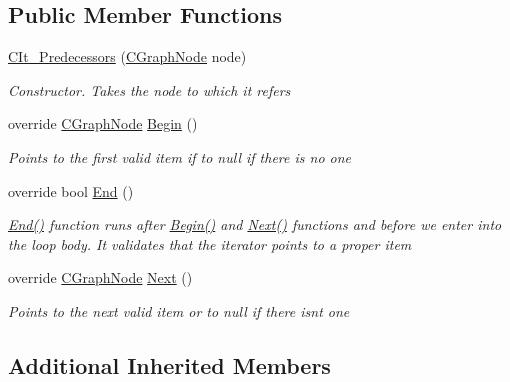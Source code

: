 \subsection*{Public Member Functions}
\begin{DoxyCompactItemize}
\item 
\hyperlink{class_graph_library_1_1_c_it___predecessors_ab9fa002e3d6b597d7712faab5613cbe3}{C\+It\+\_\+\+Predecessors} (\hyperlink{class_graph_library_1_1_c_graph_node}{C\+Graph\+Node} node)
\begin{DoxyCompactList}\small\item\em Constructor. Takes the node to which it refers \end{DoxyCompactList}\item 
override \hyperlink{class_graph_library_1_1_c_graph_node}{C\+Graph\+Node} \hyperlink{class_graph_library_1_1_c_it___predecessors_aa71033bdb63459cb6bac0c01db43bf6d}{Begin} ()
\begin{DoxyCompactList}\small\item\em Points to the first valid item if to null if there is no one \end{DoxyCompactList}\item 
override bool \hyperlink{class_graph_library_1_1_c_it___predecessors_a01294d5cb0b22ddc2e8c39edc5d2cc01}{End} ()
\begin{DoxyCompactList}\small\item\em \hyperlink{class_graph_library_1_1_c_it___predecessors_a01294d5cb0b22ddc2e8c39edc5d2cc01}{End()} function runs after \hyperlink{class_graph_library_1_1_c_it___predecessors_aa71033bdb63459cb6bac0c01db43bf6d}{Begin()} and \hyperlink{class_graph_library_1_1_c_it___predecessors_a560fdfb437097d41b4c7dd15905eae99}{Next()} functions and before we enter into the loop body. It validates that the iterator points to a proper item \end{DoxyCompactList}\item 
override \hyperlink{class_graph_library_1_1_c_graph_node}{C\+Graph\+Node} \hyperlink{class_graph_library_1_1_c_it___predecessors_a560fdfb437097d41b4c7dd15905eae99}{Next} ()
\begin{DoxyCompactList}\small\item\em Points to the next valid item or to null if there isn\textquotesingle{}t one \end{DoxyCompactList}\end{DoxyCompactItemize}
\subsection*{Additional Inherited Members}


